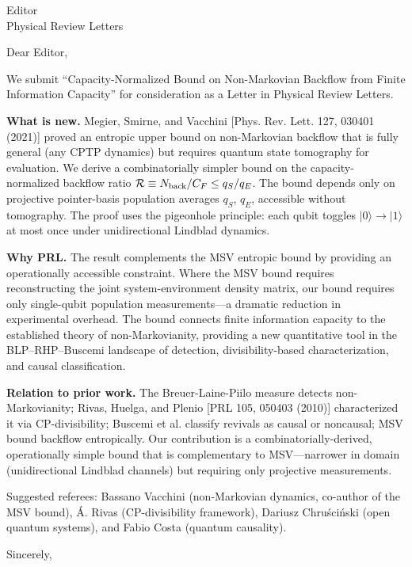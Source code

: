 \documentclass[12pt]{letter}
\begin{document}
\begin{letter}{Editor\\Physical Review Letters}

\opening{Dear Editor,}

We submit ``Capacity-Normalized Bound on Non-Markovian Backflow from Finite Information Capacity'' for consideration as a Letter in Physical Review Letters.

\textbf{What is new.} Megier, Smirne, and Vacchini [Phys. Rev. Lett. 127, 030401 (2021)] proved an entropic upper bound on non-Markovian backflow that is fully general (any CPTP dynamics) but requires quantum state tomography for evaluation. We derive a combinatorially simpler bound on the capacity-normalized backflow ratio $\mathcal{R} \equiv N_{\rm back}/C_F \leq q_S/q_E$. The bound depends only on projective pointer-basis population averages $q_S$, $q_E$, accessible without tomography. The proof uses the pigeonhole principle: each qubit toggles $|0\rangle \to |1\rangle$ at most once under unidirectional Lindblad dynamics.

\textbf{Why PRL.} The result complements the MSV entropic bound by providing an operationally accessible constraint. Where the MSV bound requires reconstructing the joint system-environment density matrix, our bound requires only single-qubit population measurements---a dramatic reduction in experimental overhead. The bound connects finite information capacity to the established theory of non-Markovianity, providing a new quantitative tool in the BLP--RHP--Buscemi landscape of detection, divisibility-based characterization, and causal classification.

\textbf{Relation to prior work.} The Breuer-Laine-Piilo measure detects non-Markovianity; Rivas, Huelga, and Plenio [PRL 105, 050403 (2010)] characterized it via CP-divisibility; Buscemi et al. classify revivals as causal or noncausal; MSV bound backflow entropically. Our contribution is a combinatorially-derived, operationally simple bound that is complementary to MSV---narrower in domain (unidirectional Lindblad channels) but requiring only projective measurements.

Suggested referees: Bassano Vacchini (non-Markovian dynamics, co-author of the MSV bound), \'A. Rivas (CP-divisibility framework), Dariusz Chru\'sci\'nski (open quantum systems), and Fabio Costa (quantum causality).

\closing{Sincerely,}

\end{letter}
\end{document}
